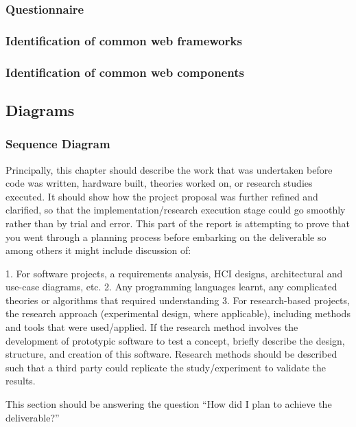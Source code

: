 \subsubsection{Questionnaire}

\subsubsection{Identification of common web frameworks}
\subsubsection{Identification of common web components}
\subsection{Diagrams}
\subsubsection{Sequence Diagram}


Principally, this chapter should describe the work that was undertaken before
code was written, hardware built, theories worked on, or research studies
executed. It should show how the project proposal was further refined and
clarified, so that the implementation/research execution stage could go
smoothly rather than by trial and error. This part of the report is attempting to
prove that you went through a planning process before embarking on the
deliverable so among others it might include discussion of:

1. For software projects, a requirements analysis, HCI designs, architectural
and use-case diagrams, etc.
2. Any programming languages learnt, any complicated theories or algorithms
that required understanding
3. For research-based projects, the research approach (experimental design,
where applicable), including methods and tools that were used/applied. If the
research method involves the development of prototypic software to test a
concept, briefly describe the design, structure, and creation of this software.
Research methods should be described such that a third party could replicate
the study/experiment to validate the results.

This section should be answering the question “How did I plan to achieve the
deliverable?”
